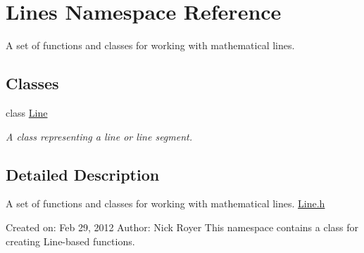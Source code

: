 \hypertarget{namespaceLines}{
\section{Lines Namespace Reference}
\label{namespaceLines}
}


A set of functions and classes for working with mathematical lines.  


\subsection*{Classes}
\begin{DoxyCompactItemize}
\item 
class \hyperlink{classLines_1_1Line}{Line}
\begin{DoxyCompactList}\small\item\em A class representing a line or line segment. \item\end{DoxyCompactList}\end{DoxyCompactItemize}


\subsection{Detailed Description}
A set of functions and classes for working with mathematical lines. \hyperlink{Line_8h}{Line.h}

Created on: Feb 29, 2012 Author: Nick Royer This namespace contains a class for creating Line-\/based functions. 